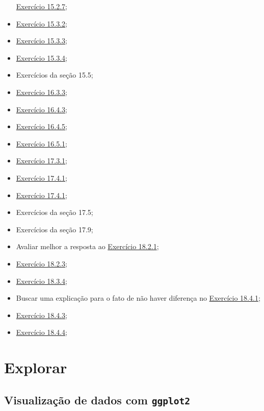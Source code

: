 \documentclass[
]{latex/krantz}
\theoremstyle{definition}
\theoremstyle{definition}
\theoremstyle{definition}
\theoremstyle{definition}
\theoremstyle{remark}
\begin{document}
\begin{itemize}
  \protect\hyperlink{exr15-2-7}{Exercício 15.2.7};
\item
  \protect\hyperlink{exr15-3-2}{Exercício 15.3.2};
\item
  \protect\hyperlink{exr15-3-3}{Exercício 15.3.3};
\item
  \protect\hyperlink{exr15-3-4}{Exercício 15.3.4};
\item
  Exercícios da seção 15.5;
\item
  \protect\hyperlink{exr16-3-3}{Exercício 16.3.3};
\item
  \protect\hyperlink{exr16-4-3}{Exercício 16.4.3};
\item
  \protect\hyperlink{exr16-4-5}{Exercício 16.4.5};
\item
  \protect\hyperlink{exr16-5-1}{Exercício 16.5.1};
\item
  \protect\hyperlink{exr17-3-1}{Exercício 17.3.1};
\item
  \protect\hyperlink{exr17-4-1}{Exercício 17.4.1};
\item
  \protect\hyperlink{exr17-4-1}{Exercício 17.4.1};
\item
  Exercícios da seção 17.5;
\item
  Exercícios da seção 17.9;
\item
  Avaliar melhor a resposta ao \protect\hyperlink{exr18-2-1}{Exercício 18.2.1};
\item
  \protect\hyperlink{exr18-2-3}{Exercício 18.2.3};
\item
  \protect\hyperlink{exr18-3-4}{Exercício 18.3.4};
\item
  Buscar uma explicação para o fato de não haver diferença no \protect\hyperlink{exr18-4-1}{Exercício 18.4.1};
\item
  \protect\hyperlink{exr18-4-3}{Exercício 18.4.3};
\item
  \protect\hyperlink{exr18-4-4}{Exercício 18.4.4};
\end{itemize}

\mainmatter

\hypertarget{part-explorar}{%
\part{Explorar}\label{part-explorar}}

\hypertarget{visualizauxe7uxe3o-de-dados-com-ggplot2}{%
\chapter{\texorpdfstring{Visualização de dados com \texttt{ggplot2}}{Visualização de dados com ggplot2}}\label{visualizauxe7uxe3o-de-dados-com-ggplot2}}
\end{document}
